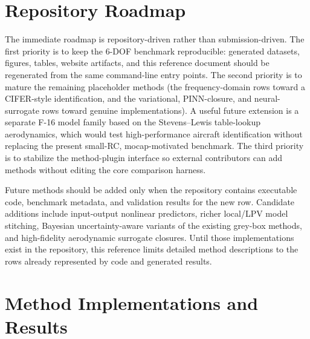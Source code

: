 \documentclass[11pt]{article}
\begin{document}
\section{Repository Roadmap}
The immediate roadmap is repository-driven rather than submission-driven. The first priority is to keep the 6-DOF benchmark reproducible: generated datasets, figures, tables, website artifacts, and this reference document should be regenerated from the same command-line entry points. The second priority is to mature the remaining placeholder methods (the frequency-domain rows toward a CIFER-style identification, and the variational, PINN-closure, and neural-surrogate rows toward genuine implementations). A useful future extension is a separate F-16 model family based on the Stevens--Lewis table-lookup aerodynamics, which would test high-performance aircraft identification without replacing the present small-RC, mocap-motivated benchmark. The third priority is to stabilize the method-plugin interface so external contributors can add methods without editing the core comparison harness.

Future methods should be added only when the repository contains executable code, benchmark metadata, and validation results for the new row. Candidate additions include input-output nonlinear predictors, richer local/LPV model stitching, Bayesian uncertainty-aware variants of the existing grey-box methods, and high-fidelity aerodynamic surrogate closures. Until those implementations exist in the repository, this reference limits detailed method descriptions to the rows already represented by code and generated results.

\appendix
\section{Method Implementations and Results}
\label{app:implementation}
\end{document}
